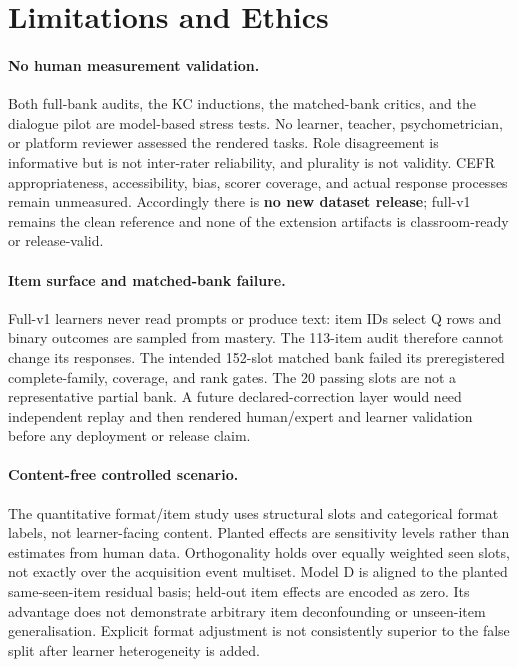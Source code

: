 \section{Limitations and Ethics}
\label{sec:limitations}

\paragraph{No human measurement validation.}
Both full-bank audits, the KC inductions, the matched-bank critics, and the
dialogue pilot are model-based stress tests.  No learner, teacher,
psychometrician, or platform reviewer assessed the rendered tasks.  Role
disagreement is informative but is not inter-rater reliability, and plurality
is not validity.  CEFR appropriateness, accessibility, bias, scorer coverage,
and actual response processes remain unmeasured.  Accordingly there is
\textbf{no new dataset release}; full-v1 remains the clean reference and none of
the extension artifacts is classroom-ready or release-valid.

\paragraph{Item surface and matched-bank failure.}
Full-v1 learners never read prompts or produce text: item IDs select Q rows and
binary outcomes are sampled from mastery.  The 113-item audit therefore cannot
change its responses.  The intended 152-slot matched bank failed its
preregistered complete-family, coverage, and rank gates.  The 20 passing slots
are not a representative partial bank.  A future declared-correction layer
would need independent replay and then rendered human/expert and learner
validation before any deployment or release claim.

\paragraph{Content-free controlled scenario.}
The quantitative format/item study uses structural slots and categorical
format labels, not learner-facing content.  Planted effects are sensitivity
levels rather than estimates from human data.  Orthogonality holds over equally
weighted seen slots, not exactly over the acquisition event multiset.  Model D
is aligned to the planted same-seen-item residual basis; held-out item effects
are encoded as zero.  Its advantage does not demonstrate arbitrary item
deconfounding or unseen-item generalisation.  Explicit format adjustment is not
consistently superior to the false split after learner heterogeneity is added.

